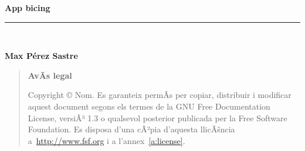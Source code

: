 \newlength{\centeroffset}
\setlength{\centeroffset}{-0.5\oddsidemargin}
\addtolength{\centeroffset}{0.5\evensidemargin}
\thispagestyle{empty}
\noindent\hspace*{\centeroffset}\begin{minipage}{\textwidth}
\vspace*{3truecm}

\flushright
{\Huge\bfseries 
  App bicing
}
\noindent\rule[-1ex]{\textwidth}{5pt}\\[4.5ex]
\end{minipage}

\noindent\hspace*{\centeroffset}\begin{minipage}{\textwidth}
\flushright
{\bfseries 
	Max Pérez Sastre
}
\end{minipage}


\pagebreak
\thispagestyle{empty}

\vspace*{16truecm}

	\begin{quote}
	\textbf{AvÃ­s legal}

	  Copyright \copyright{}  Nom.
	  Es garanteix permÃ­s per copiar, distribuir i modificar aquest document segons els termes de la GNU Free Documentation License, versiÃ³ 1.3 o qualsevol posterior publicada per la Free Software Foundation. Es disposa d'una cÃ²pia d'aquesta llicÃšncia a~\href{http://www.fsf.org}{http://www.fsf.org} i a l'annex~\ref{a:license}.
	\end{quote}	





\endinput

